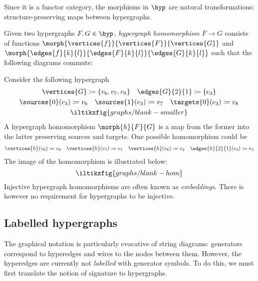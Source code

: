 Since it is a functor category, the morphisms in \(\hyp\) are natural
transformations: structure-preserving maps between hypergraphs.

\begin{definition}
    Given two hypergraphs \(F, G \in \hyp\), \emph{hypergraph homomorphism}
    \(F \to G\) consists of functions
    \(\morph{\vertices{f}}{\vertices{F}}{\vertices{G}}\) and
    \(\morph{\edges{f}{k}{l}}{\edges{F}{k}{l}}{\edges{G}{k}{l}}\) such that the
    following diagrams commute:
    
\end{definition}

\begin{example}
    Consider the following hypergraph
    \begin{gather*}
        \vertices{G} \coloneqq \{v_6,v_7,v_8\}
        \quad
        \edges{G}{2}{1} \coloneqq \{e_3\}
        \\
        \sources{0}(e_3) \coloneqq v_6
        \quad
        \sources{1}(e_3) \coloneqq v_7
        \quad
        \targets{0}(e_3) \coloneqq v_8
        \\
        \iltikzfig{graphs/blank-smaller}
    \end{gather*}
    A hypergraph homomorphism \(\morph{h}{F}{G}\) is a map from the former into
    the latter preserving sources and targets.
    One possible homomorphism could be
    \begin{gather*}
        \vertices{h}(v_6) \coloneqq v_0
        \quad
        \vertices{h}(v_7) \coloneqq v_1
        \quad
        \vertices{h}(v_8) \coloneqq v_2
        \quad
        \edges{h}{2}{1}(e_3) \coloneqq e_3
    \end{gather*}
    The image of the homomorphism is illustrated below:
    \[
        \iltikzfig{graphs/blank-hom}
    \]
    Injective hypergraph homomorphisms are often known as \emph{embeddings}.
    There is however no requirement for hypergraphs to be injective.
\end{example}

\subsection{Labelled hypergraphs}

The graphical notation is particularly evocative of string diagrams: generators
correspond to hyperedges and wires to the nodes between them.
However, the hyperedges are currently not \emph{labelled} with generator
symbols.
To do this, we must first translate the notion of signature to hypergraphs.

